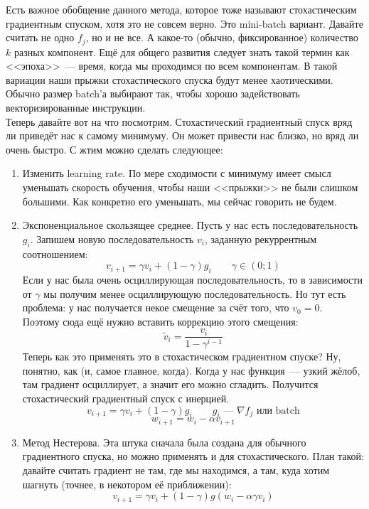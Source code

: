 \documentclass{article}
\begin{document}
    Есть важное обобщение данного метода, которое тоже называют стохастическим градиентным спуском, хотя это не совсем верно. Это mini-batch вариант. Давайте считать не одно $f_j$, но и не все. А какое-то (обычно, фиксированное) количество $k$ разных компонент. Ещё для общего развития следует знать такой термин как <<эпоха>>~--- время, когда мы проходимся по всем компонентам. В такой вариации наши прыжки стохастического спуска будут менее хаотическими. Обычно размер batch'а выбирают так, чтобы хорошо задействовать векторизированные инструкции.\\
    Теперь давайте вот на что посмотрим. Стохастический градиентный спуск вряд ли приведёт нас к самому минимуму. Он может привести нас близко, но вряд ли очень быстро. С жтим можно сделать следующее:
    \begin{enumerate}
        \item Изменить learning rate. По мере сходимости с минимуму имеет смысл уменьшать скорость обучения, чтобы наши <<прыжки>> не были слишком большими. Как конкретно его уменьшать, мы сейчас говорить не будем.
        \item Экспоненциальное скользящее среднее. Пусть у нас есть последовательность $g_i$. Запишем новую последовательность $v_i$, заданную рекуррентным соотношением:
        $$
        v_{i+1}=\gamma v_i+(1-\gamma)g_i\qquad\gamma\in(0;1)
        $$
        Если у нас была очень осциллирующая последовательность, то в зависимости от $\gamma$ мы получим менее осциллирующую последовательность. Но тут есть проблема: у нас получается некое смещение за счёт того, что $v_0=0$.\\
        Поэтому сюда ещё нужно вставить коррекцию этого смещения:
        $$
        \widetilde v_i=\frac{v_i}{1-\gamma^{i-1}}
        $$
        Теперь как это применять это в стохастическом градиентном спуске? Ну, понятно, как (и, самое главное, когда). Когда у нас функция~--- узкий жёлоб, там градиент осциллирует, а значит его можно сгладить. Получится стохастический градиентный спуск с инерцией.
        $$
        v_{i+1}=\gamma v_i+(1-\gamma)g_i\qquad g_i\text{~--- }\nabla f_j\text{ или batch}
        $$
        $$
        w_{i+1}=w_i-\alpha v_{i+1}
        $$
        \item Метод Нестерова. Эта штука сначала была создана для обычного градиентного спуска, но можно применять и для стохастического. План такой: давайте считать градиент не там, где мы находимся, а там, куда хотим шагнуть (точнее, в некотором её приближении):
        $$
        v_{i+1}=\gamma v_i+(1-\gamma)g(w_i-\alpha\gamma v_i)
$$
\end{enumerate}
\end{document}
